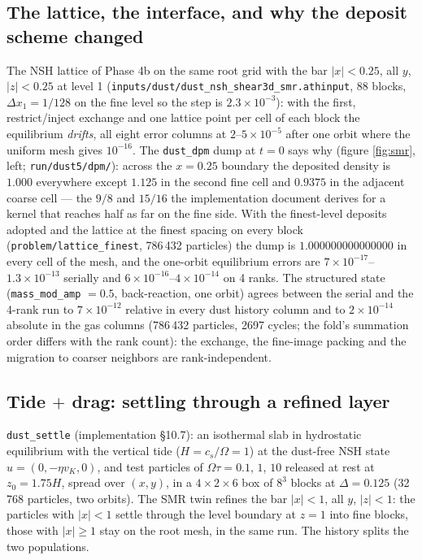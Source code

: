\documentclass[11pt]{article}
\newcommand{\code}[1]{\texttt{#1}}
\newcommand{\file}[1]{\texttt{#1}}
\begin{document}
\subsection{The lattice, the interface, and why the deposit scheme changed}

The NSH lattice of Phase 4b on the same root grid with the bar $|x| < 0.25$, all $y$,
$|z| < 0.25$ at level 1 (\file{inputs/dust/dust\_nsh\_shear3d\_smr.athinput}, 88 blocks,
$\Delta x_1 = 1/128$ on the fine level so the step is $2.3\times10^{-3}$): with the first,
restrict/inject exchange and one lattice point per cell of each block the equilibrium
\emph{drifts}, all eight error columns at $2$--$5\times10^{-5}$ after one orbit where the
uniform mesh gives $10^{-16}$. The \code{dust\_dpm} dump at $t = 0$ says why (figure
\ref{fig:smr}, left; \file{run/dust5/dpm/}): across the $x = 0.25$ boundary the deposited
density is $1.000$ everywhere except $1.125$ in the second fine cell and $0.9375$ in the
adjacent coarse cell --- the $9/8$ and $15/16$ the implementation document derives for a
kernel that reaches half as far on the fine side. With the finest-level deposits adopted
and the lattice at the finest spacing on every block (\code{problem/lattice\_finest},
786\,432 particles) the dump is $1.000000000000000$ in every cell of the mesh, and the
one-orbit equilibrium errors are $7\times10^{-17}$--$1.3\times10^{-13}$ serially and $6\times10^{-16}$--$4\times10^{-14}$ on 4 ranks. The
structured state (\code{mass\_mod\_amp} $= 0.5$, back-reaction, one orbit) agrees between
the serial and the 4-rank run to $7\times10^{-12}$ relative in every dust history column and to $2\times10^{-14}$ absolute in the gas columns (786\,432 particles, 2697 cycles; the fold's summation order differs with the rank count): the
exchange, the fine-image packing and the migration to coarser neighbors are
rank-independent.

\subsection{Tide $+$ drag: settling through a refined layer}

\code{dust\_settle} (implementation \S10.7): an isothermal slab in hydrostatic
equilibrium with the vertical tide ($H = c_s/\Omega = 1$) at the dust-free NSH state
$u = (0, -\eta v_K, 0)$, and test particles of $\Omega\tau = 0.1$, $1$, $10$ released at
rest at $z_0 = 1.75H$, spread over $(x,y)$, in a $4\times2\times6$ box of $8^3$ blocks at
$\Delta = 0.125$ (32\,768 particles, two orbits). The SMR twin refines the bar $|x| < 1$,
all $y$, $|z| < 1$: the particles with $|x| < 1$ settle through the level boundary at
$z = 1$ into fine blocks, those with $|x| \ge 1$ stay on the root mesh, in the same run.
The history splits the two populations.
\end{document}
